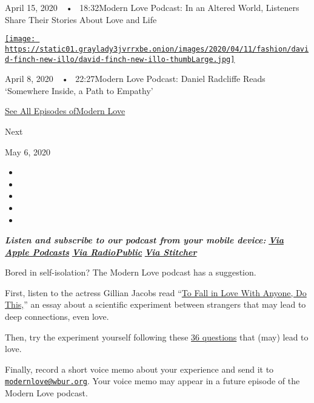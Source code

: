 April 15, 2020~~•~ 18:32Modern Love Podcast: In an Altered World,
Listeners Share Their Stories About Love and Life

\href{https://www.nytimes3xbfgragh.onion/2020/04/08/style/modern-love-podcast-daniel-radcliffe.html?action=click\&module=audio-series-bar\&region=header\&pgtype=Article}{\texttt{[image: https://static01.graylady3jvrrxbe.onion/images/2020/04/11/fashion/david-finch-new-illo/david-finch-new-illo-thumbLarge.jpg]}}

April 8, 2020~~•~ 22:27Modern Love Podcast: Daniel Radcliffe Reads
`Somewhere Inside, a Path to Empathy'

\href{https://www.nytimes3xbfgragh.onion/column/modern-love-podcast}{See
All Episodes ofModern Love}

Next

May 6, 2020

\begin{itemize}
\item
\item
\item
\item
\item
\end{itemize}

\emph{\textbf{Listen and subscribe to our podcast from your mobile
device:}}
\textbf{\href{https://itunes.apple.com/us/podcast/modern-love/id1065559535?mt=2}{\emph{Via
Apple Podcasts}}} \emph{\textbf{\textbar{}}}
\textbf{\href{https://radiopublic.com/ModernLove}{\emph{Via
RadioPublic}}} \emph{\textbf{\textbar{}}}
\textbf{\href{https://www.stitcher.com/podcast/wbur/modern-love}{\emph{Via
Stitcher}}}

Bored in self-isolation? The Modern Love podcast has a suggestion.

First, listen to the actress Gillian Jacobs read
``\href{https://www.nytimes3xbfgragh.onion/2015/01/11/style/modern-love-to-fall-in-love-with-anyone-do-this.html}{To
Fall in Love With Anyone, Do This,}'' an essay about a scientific
experiment between strangers that may lead to deep connections, even
love.

Then, try the experiment yourself following these
\href{https://www.nytimes3xbfgragh.onion/2015/01/11/style/36-questions-that-lead-to-love.html}{36
questions} that (may) lead to love.

Finally, record a short voice memo about your experience and send it to
\href{mailto:modernlove@wbur.org}{\nolinkurl{modernlove@wbur.org}}. Your
voice memo may appear in a future episode of the Modern Love podcast.


